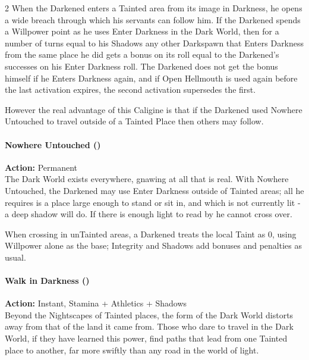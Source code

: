 \begin{multicols}{2}
When the Darkened enters a Tainted area from its image in Darkness, he opens a wide breach through which his servants can follow him. If the Darkened spends a Willpower point as he uses Enter Darkness in the Dark World, then for a number of turns equal to his Shadows any other Darkspawn that Enters Darkness from the same place he did gets a bonus on its roll equal to the Darkened's successes on his Enter Darkness roll. The Darkened does not get the bonus himself if he Enters Darkness again, and if Open Hellmouth is used again before the last activation expires, the second activation supersedes the first.

However the real advantage of this Caligine is that if the Darkened used Nowhere Untouched to travel outside of a Tainted Place then others may follow.

\paragraph*{Nowhere Untouched (\textbullet\textbullet)} 

\noindent \textbf{Action:} Permanent \\

\noindent The Dark World exists everywhere, gnawing at all that is real. With Nowhere Untouched, the Darkened may use Enter Darkness outside of Tainted areas; all he requires is a place large enough to stand or sit in, and which is not currently lit - a deep shadow will do. If there is enough light to read by he cannot cross over.

When crossing in unTainted areas, a Darkened treats the local Taint as 0, using Willpower alone as the base; Integrity and Shadows add bonuses and penalties as usual.\\

\paragraph*{Walk in Darkness (\textbullet\textbullet\textbullet)} 

\noindent \textbf{Action:} Instant, Stamina + Athletics + Shadows \\

\noindent Beyond the Nightscapes of Tainted places, the form of the Dark World distorts away from that of the land it came from. Those who dare to travel in the Dark World, if they have learned this power, find paths that lead from one Tainted place to another, far more swiftly than any road in the world of light.


\end{multicols}
